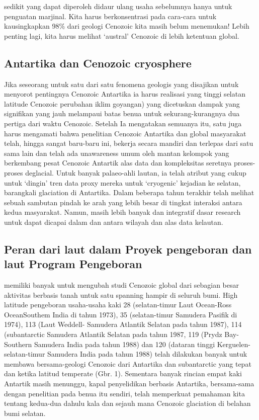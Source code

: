 	sedikit yang dapat diperoleh didaur ulang usaha sebelumnya hanya untuk penguatan marjinal. Kita harus berkonsentrasi pada cara-cara untuk kausingkapkan 
	98\% dari geologi Cenozoic kita masih belum menemukan! Lebih penting lagi, kita harus melihat `austral' Cenozoic di lebih ketentuan global\cite{peter1990Antartica}.
	

\subsection{Antartika dan Cenozoic cryosphere}

		Jika seseorang untuk satu dari satu fenomena geologis yang disajikan untuk menyorot pentingnya Cenozoic Antartika ia harus realisasi yang tinggi 
	selatan latitude Cenozoic perubahan iklim goyangan) yang dicetuskan dampak yang signifikan yang jauh melampaui batas benua untuk sekurang-kurangnya 
	dua pertiga dari waktu Cenozoic. Setelah Ia mengatakan semuanya itu, satu juga harus mengamati bahwa penelitian Cenozoic Antartika dan global 
	masyarakat telah, hingga sangat baru-baru ini, bekerja secara mandiri dan terlepas dari satu sama lain dan telah ada unawareness umum oleh mantan 
	kelompok yang berkembang pesat Cenozoic Antartik alas data dan kompleksitas seretnya proses-proses deglacial. Untuk banyak palaeo-ahli lautan, 
	ia telah atribut yang cukup untuk `dingin' tren data proxy mereka untuk `cryogenic' kejadian ke selatan, barangkali glaciation di Antartika. 
	Dalam beberapa tahun terakhir telah melihat sebuah sambutan pindah ke arah yang lebih besar di tingkat interaksi antara kedua masyarakat. 
	Namun, masih lebih banyak dan integratif dasar research untuk dapat dicapai dalam dan antara wilayah dan alas data kelautan.
	
	
\subsection{Peran dari laut dalam Proyek pengeboran dan laut Program Pengeboran}
		
		memiliki banyak untuk mengubah studi Cenozoic global dari sebagian besar aktivitas berbasis tanah untuk satu spanning hampir di seluruh bumi. 
	High latitude pengeboran usaha-usaha kaki 28 (selatan-timur Laut Ocean-Ross OceanSouthem India di tahun 1973), 35 (selatan-timur Samudera Pasifik di 1974), 
	113 (Laut Weddell- Samudera Atlantik Selatan pada tahun 1987), 114 (subantarctic Samudera Atlantik Selatan pada tahun 1987, 
	119 (Prydz Bay-Southern Samudera India pada tahun 1988) dan 120 (dataran tinggi Kerguelen-selatan-timur Samudera India pada tahun 1988) telah dilakukan 
	banyak untuk membawa bersama-geologi Cenozoic dari Antartika dan subantarctic yang tepat dan ketika latitud temperate (Gbr. 1). 
	Sementara banyak rincian empat kaki Antartik masih menunggu, kapal penyelidikan berbasis Antartika, bersama-sama dengan penelitian pada benua itu 
	sendiri, telah memperkuat pemahaman kita tentang kedua-dua dahulu kala dan sejauh mana Cenozoic glaciation di belahan bumi selatan.
	

